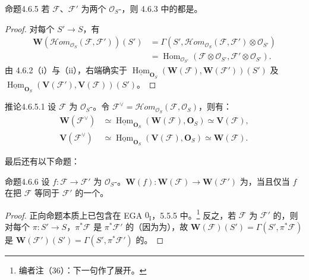 \begin{SGAresult}{命题}{4.6.5}
若 $\mathcal F$、$\mathcal F'$ 为两个 $\mathcal O_S$-，则 4.6.3 中的都是。
\end{SGAresult}
\begin{proof}
对每个 $S'\to S$，有
\[
\begin{aligned}
\mathbf W(\mathcal{H}om_{\mathcal O_S}(\mathcal F,\mathcal F'))(S')
&=\Gamma(S',\mathcal{H}om_{\mathcal O_S}(\mathcal F,\mathcal F')\otimes\mathcal O_{S'})\\
&=\operatorname{Hom}_{\mathcal O_{S'}}(\mathcal F\otimes\mathcal O_{S'},\mathcal F'\otimes\mathcal O_{S'}).
\end{aligned}
\]
由 4.6.2（i）与（ii），右端确实于 $\underline{\operatorname{Hom}}_{\mathbf O_S}(\mathbf W(\mathcal F),\mathbf W(\mathcal F'))(S')$ 及 $\underline{\operatorname{Hom}}_{\mathbf O_S}(\mathbf V(\mathcal F'),\mathbf V(\mathcal F))(S')$。
\end{proof}
\begin{SGAresult}{推论}{4.6.5.1}
设 $\mathcal F$ 为 $\mathcal O_S$-。令 $\mathcal F^\vee=\mathcal{H}om_{\mathcal O_S}(\mathcal F,\mathcal O_S)$，则有：
\[
\begin{aligned}
\mathbf W(\mathcal F^\vee)&\simeq\underline{\operatorname{Hom}}_{\mathbf O_S}(\mathbf W(\mathcal F),\mathbf O_S)\simeq\mathbf V(\mathcal F),\\
\mathbf V(\mathcal F^\vee)&\simeq\underline{\operatorname{Hom}}_{\mathbf O_S}(\mathbf V(\mathcal F),\mathbf O_S)\simeq\mathbf W(\mathcal F).
\end{aligned}
\]
\end{SGAresult}
最后还有以下命题：
\begin{SGAresult}{命题}{4.6.6}
设 $f:\mathcal F\to\mathcal F'$ 为 $\mathcal O_S$-。$\mathbf W(f):\mathbf W(\mathcal F)\to\mathbf W(\mathcal F')$ 为，当且仅当 $f$ 在把 $\mathcal F$ 等同于 $\mathcal F'$ 的一个。
\end{SGAresult}
\begin{proof}
正向命题本质上已包含在 EGA $0_{\mathrm I}$，5.5.5 中。\footnote{编者注（36）：下一句作了展开。} 反之，若 $\mathcal F$ 为 $\mathcal F'$ 的，则对每个 $\pi:S'\to S$，$\pi^*\mathcal F$ 是 $\pi^*\mathcal F'$ 的（因为为），故 $\mathbf W(\mathcal F)(S')=\Gamma(S',\pi^*\mathcal F)$ 是 $\mathbf W(\mathcal F')(S')=\Gamma(S',\pi^*\mathcal F')$ 的。
\end{proof}

